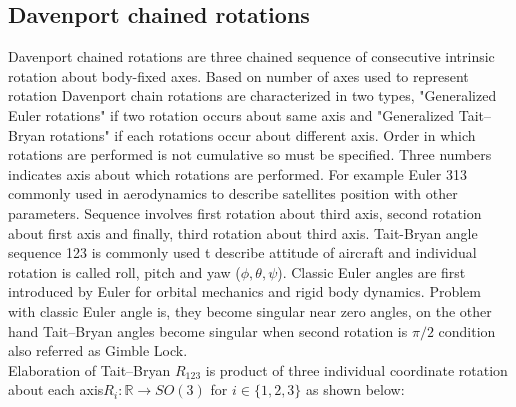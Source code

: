 \subsection{Davenport chained rotations}
Davenport chained rotations are three chained sequence of consecutive intrinsic rotation about body-fixed axes. Based on number of axes used to represent rotation Davenport chain rotations are characterized in two types, "Generalized Euler rotations" if two rotation occurs about same axis and "Generalized Tait–Bryan rotations" if each rotations occur about different axis. Order in which rotations are performed is not cumulative so must be specified. Three numbers indicates axis about which rotations are performed. For example Euler 313 commonly used in aerodynamics to describe satellites position with other parameters. Sequence involves first rotation about third axis, second rotation about first axis and finally, third rotation about third axis. Tait-Bryan angle sequence 123 is commonly used t describe attitude of aircraft and individual rotation is called roll, pitch and yaw ($ \phi ,\theta ,\psi $). Classic Euler angles are first introduced by Euler for orbital mechanics and rigid body dynamics. Problem with classic Euler angle is, they become singular near zero angles, on the other hand Tait–Bryan angles become singular when second rotation is $ \pi/2$ condition also referred as Gimble Lock. \\

\noindent Elaboration of Tait–Bryan $ R_{123}$ is product of three individual coordinate rotation about each axis$ R_{i} :\mathbb{R}\longrightarrow SO( 3)$ for $ i\in \{1,2,3\}$ as shown below:



